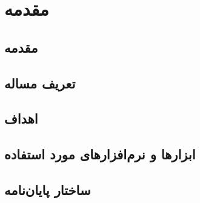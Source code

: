 \chapter{مقدمه}
\section{مقدمه}

\section{تعریف مساله}
\section{اهداف}
\section{ابزار‌ها و نرم‌افزار‌های مورد استفاده}
\section{ساختار پایان‌نامه}